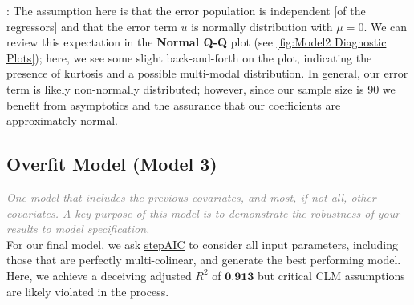 \begin{description}[font=$\bullet$~\normalfont\scshape\small\color{red!50!black}]
	\item [CLM 6 - Normality] {\fontsize{10}{10} \selectfont : The assumption here is that the error population is independent [of the regressors] and that the error term $u$ is normally distribution with $\mu = 0$.  We can review this expectation in the \textbf{Normal Q-Q} plot (see \ref{fig:Model2 Diagnostic Plots}); here, we see some slight back-and-forth on the plot, indicating the presence of kurtosis and a possible multi-modal distribution.  In general, our error term is likely non-normally distributed; however, since our sample size is 90 we benefit from asymptotics and the assurance that our coefficients are approximately normal.}
\end{description}

\pagebreak

\subsection{Overfit Model (Model 3)}
\label{sec:Model3}

\textit{\textcolor{Grey}{One model that includes the previous covariates, and most, if not all, other covariates. A key purpose of this model is to demonstrate the robustness of your results to model specification.}}\\

For our final model, we ask \href{https://www.rdocumentation.org/packages/MASS/versions/7.3-51.4/topics/stepAIC}{stepAIC} to consider all input parameters, including those that are perfectly multi-colinear, and generate the best performing model.  Here, we achieve a deceiving adjusted $R^2$ of $\textbf{0.913}$ but critical CLM assumptions are likely violated in the process.\\


